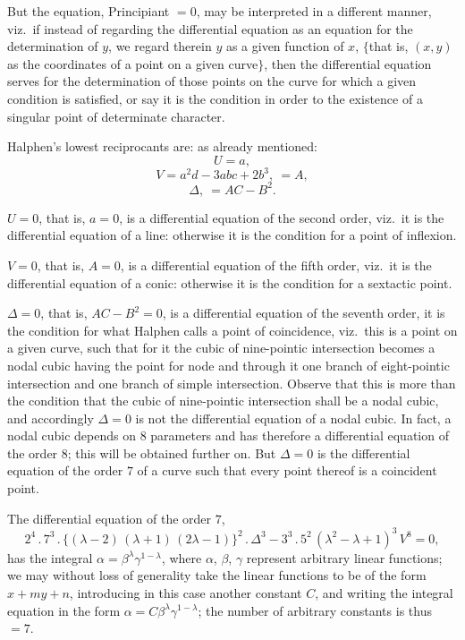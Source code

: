 \documentclass[11pt]{article}
\begin{document}
But the equation, Principiant $= 0$, may be interpreted in a different manner, viz.\ if instead of regarding the differential equation as an equation for the determination of $y$, we regard therein $y$ as a given function of $x$, $\{$that is, $(x, y)$ as the coordinates of a point on a given curve$\}$, then the differential equation serves for the determination of those points on the curve for which a given condition is satisfied, or say it is the condition in order to the existence of a singular point of determinate character.

Halphen's lowest reciprocants are: as already mentioned:
\[
U = a,
\]
\[
V = a^2 d - 3 a b c + 2 b^3,\ = A,
\]
\[
\Delta,\ = A C - B^2.
\]

$U = 0$, that is, $a = 0$, is a differential equation of the second order, viz.\ it is the differential equation of a line: otherwise it is the condition for a point of inflexion.

$V = 0$, that is, $A = 0$, is a differential equation of the fifth order, viz.\ it is the differential equation of a conic: otherwise it is the condition for a sextactic point.

$\Delta = 0$, that is, $A C - B^2 = 0$, is a differential equation of the seventh order, it is the condition for what Halphen calls a point of coincidence, viz.\ this is a point on a given curve, such that for it the cubic of nine-pointic intersection becomes a nodal cubic having the point for node and through it one branch of eight-pointic intersection and one branch of simple intersection. Observe that this is more than the condition that the cubic of nine-pointic intersection shall be a nodal cubic, and accordingly $\Delta = 0$ is not the differential equation of a nodal cubic. In fact, a nodal cubic depends on $8$ parameters and has therefore a differential equation of the order $8$; this will be obtained further on. But $\Delta = 0$ is the differential equation of the order $7$ of a curve such that every point thereof is a coincident point.

The differential equation of the order $7$,
\[
2^4\,.\,7^3\,.\,\{(\lambda - 2)\,(\lambda + 1)\,(2\lambda - 1)\}^2\,.\,\Delta^3 - 3^3\,.\,5^2\,(\lambda^2 - \lambda + 1)^3\,V^8 = 0,
\]
has the integral $\alpha = \beta^\lambda\gamma^{1-\lambda}$, where $\alpha$, $\beta$, $\gamma$ represent arbitrary linear functions; we may without loss of generality take the linear functions to be of the form $x + m y + n$, introducing in this case another constant $C$, and writing the integral equation in the form $\alpha = C\beta^\lambda\gamma^{1-\lambda}$; the number of arbitrary constants is thus $= 7$.
\end{document}
